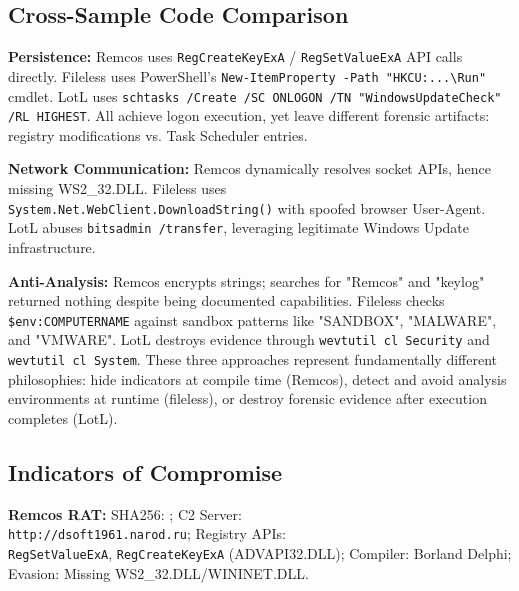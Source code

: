 \documentclass[sigconf]{acmart}
\begin{document}

\subsection{Cross-Sample Code Comparison}

\vspace{0.5em}
\qquad \textbf{Persistence:} Remcos uses \texttt{RegCreateKeyExA} / \texttt{RegSetValueExA} API calls directly. Fileless uses PowerShell's \texttt{New-ItemProperty -Path "HKCU:...\textbackslash Run"} cmdlet. LotL uses \texttt{schtasks /Create /SC ONLOGON /TN "WindowsUpdateCheck" /RL HIGHEST}. All achieve logon execution, yet leave different forensic artifacts: registry modifications vs. Task Scheduler entries.

\qquad \textbf{Network Communication:} Remcos dynamically resolves socket APIs, hence missing WS2\_32.DLL. Fileless uses \\  \texttt{System.Net.WebClient.DownloadString()} with spoofed browser User-Agent. LotL abuses \texttt{bitsadmin /transfer}, leveraging legitimate Windows Update infrastructure.

\qquad \textbf{Anti-Analysis:} Remcos encrypts strings; searches for "Remcos" and "keylog" returned nothing despite being documented capabilities. Fileless checks \texttt{\$env:COMPUTERNAME} against sandbox patterns like "SANDBOX", "MALWARE", and "VMWARE". LotL destroys evidence through \texttt{wevtutil cl Security} and \texttt{wevtutil cl System}. These three approaches represent fundamentally different philosophies: hide indicators at compile time (Remcos), detect and avoid analysis environments at runtime (fileless), or destroy forensic evidence after execution completes (LotL).


\subsection{Indicators of Compromise}

\vspace{0.5em}
\qquad \textbf{Remcos RAT:} SHA256: \texttt{}; C2 Server: \\ \texttt{http://dsoft1961.narod.ru}; Registry APIs: \\ \texttt{RegSetValueExA}, \texttt{RegCreateKeyExA} (ADVAPI32.DLL); Compiler: Borland Delphi; Evasion: Missing WS2\_32.DLL/WININET.DLL.
\end{document}

